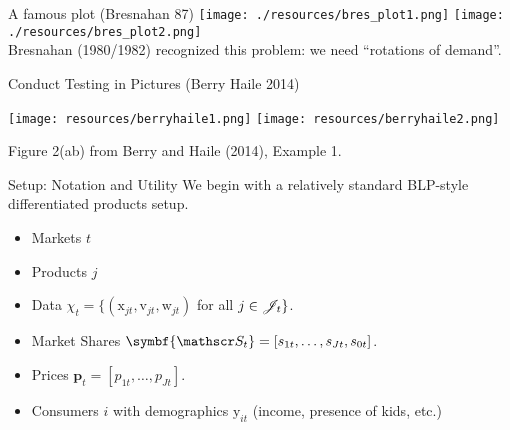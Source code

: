 \documentclass[aspectratio=169,10pt]{beamer}
\begin{document}
\begin{frame}{A famous plot (Bresnahan 87)}
\texttt{[image: ./resources/bres\_plot1.png]}
\texttt{[image: ./resources/bres\_plot2.png]}\\
Bresnahan (1980/1982) recognized this problem: we need ``rotations of demand''.
\end{frame}


\begin{frame}[plain]{Conduct Testing in Pictures (Berry Haile 2014)}
\begin{center}
\texttt{[image: resources/berryhaile1.png]}
\texttt{[image: resources/berryhaile2.png]}
\end{center}
\small{Figure 2(ab) from Berry and Haile (2014), Example 1.}
\end{frame}




\begin{frame}{Setup: Notation and Utility}
We begin with a relatively standard BLP-style differentiated products setup.\\

\begin{itemize}
    \item Markets $t$
    \item Products $j$
    \item Data $\chi_t = \{(\textrm{x}_{jt},\textrm{v}_{jt},\textrm{w}_{jt})$ for all $j \in \mathscr{J}_t\}$.
    \item Market Shares $\symbf{\calS_t} = [s_{1t}, \ldots, s_{Jt}, s_{0t}]$.
    \item Prices $\symbf{p}_t = [p_{1t}, \ldots, p_{Jt}]$.
    \item Consumers $i$ with demographics $\textrm{y}_{it}$ (income, presence of kids, etc.)
\end{itemize}
\end{frame}
\end{document}
